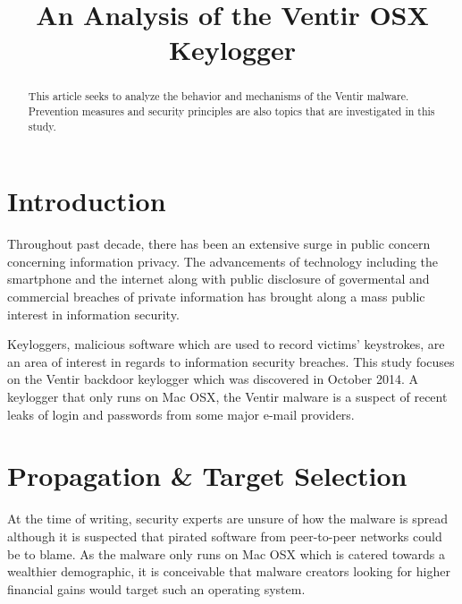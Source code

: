 \documentclass[conference]{IEEEtran}
\begin{document}
\title{An Analysis of the Ventir OSX Keylogger}


\author{
\and
{}
}

\maketitle

\begin{abstract}
This article seeks to analyze the behavior and mechanisms of the Ventir malware.
Prevention measures and security principles are also topics that are
investigated in this study.
\end{abstract}

\section{Introduction}
Throughout past decade, there has been an extensive surge in public concern
concerning information privacy. The advancements of technology including the
smartphone and the internet along with public disclosure of govermental and
commercial breaches of private information has brought along a mass public
interest in information security\cite{eset_trends}.

Keyloggers, malicious software which are used to record victims' keystrokes, are
an area of interest in regards to information security breaches. This study
focuses on the Ventir backdoor keylogger which was discovered in October 2014. A
keylogger that only runs on Mac OSX, the Ventir malware is a suspect of recent
leaks of login and passwords from some major e-mail
providers\cite{kuzin_ventir_2014}.

\section{Propagation \& Target Selection}
At the time of writing, security experts are unsure of how the malware is spread
although it is suspected that pirated software from peer-to-peer networks could
be to blame\cite{kuzin_ventir_2014}. As the malware only runs on Mac OSX which
is catered towards a wealthier demographic, it is conceivable that malware
creators looking for higher financial gains would target such an operating
system\cite{scharr_ventir}.
\end{document}

